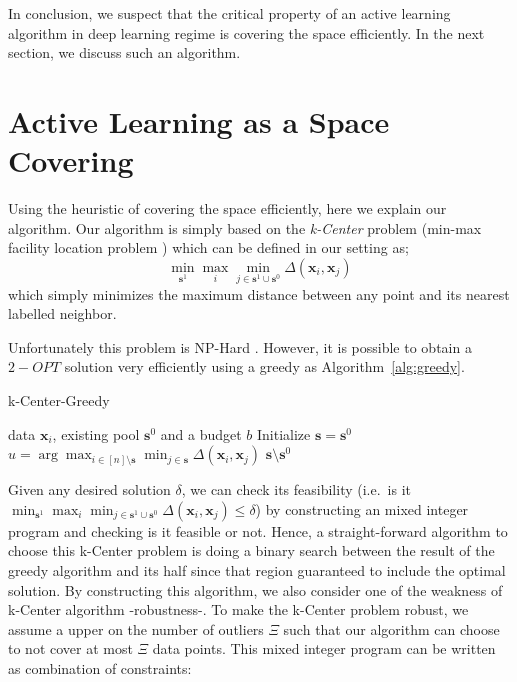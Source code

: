 \documentclass{article}
\begin{document}
In conclusion, we suspect that the critical property of an active learning algorithm in deep learning regime is covering the space efficiently. In the next section, we discuss such an algorithm.

\section{Active Learning as a Space Covering}
Using the heuristic of covering the space efficiently, here we explain our algorithm. Our algorithm is simply based on the \emph{k-Center} problem (min-max facility location problem \cite{cook}) which can be defined in our setting as;
\begin{equation}
\min_{\mathbf{s}^1} \max_i \min_{j \in \mathbf{s}^1 \cup \mathbf{s}^0} \Delta(\mathbf{x}_i,\mathbf{x}_j)
\end{equation}
which simply minimizes the maximum distance between any point and its nearest labelled neighbor. 

Unfortunately this problem is NP-Hard \cite{cook}. However, it is possible to obtain a $2-OPT$ solution very efficiently using a greedy as Algorithm~\ref{alg:greedy}.

\begin{algorithm}[ht]
   \caption{k-Center-Greedy}
   \label{alg:greedy}
\begin{algorithmic}
    data $\mathbf{x}_i$, existing pool $\mathbf{s}^0$ and a budget $b$
    \STATE Initialize $\mathbf{s}=\mathbf{s}^0$
   \REPEAT
   \STATE $u=\arg\max_{i \in [n] \setminus \mathbf{s}} \min_{j \in \mathbf{s}} \Delta(\mathbf{x}_i, \mathbf{x}_j)$
    $\mathbf{s} \setminus \mathbf{s}^0$
\end{algorithmic}
\end{algorithm}

Given any desired solution $\delta$, we can check its feasibility (i.e.\ is it $\min_{\mathbf{s}^1} \max_i \min_{j \in \mathbf{s}^1 \cup \mathbf{s}^0} \Delta(\mathbf{x}_i,\mathbf{x}_j) \leq \delta$) by constructing an mixed integer program and checking is it feasible or not. Hence, a straight-forward algorithm to choose this k-Center problem is doing a binary search between the result of the greedy algorithm and its half since that region guaranteed to include the optimal solution. By constructing this algorithm, we also consider one of the weakness of k-Center algorithm -robustness-. To make the k-Center problem robust, we assume a upper on the number of outliers $\Xi$ such that our algorithm can choose to not cover at most $\Xi$ data points. This mixed integer program can be written as combination of constraints:
\end{document}
